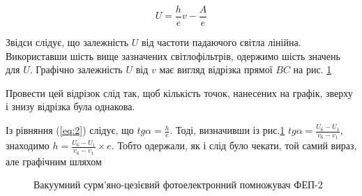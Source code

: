 \documentclass[twocolumn]{el-author}
\begin{document}
\begin{equation} \label{eq:2}
U = \frac{h}{e}v - \frac{A}{e}
\end{equation}

Звідси слідує, що залежність $U$ від частоти падаючого світла лінійна. Використавши шість вище зазначених світлофільтрів, одержимо шість значень для $U$. Графічно залежність $U$ від $v$ має вигляд відрізка прямої $BC$ на рис. \ref{img:1}

\begin{figure}[h]
\caption{\source{}}
\label{img:1}
\end{figure}

Провести цей відрізок слід так, щоб кількість точок, нанесених на
графік, зверху і знизу відрізка була однакова.

Із рівняння (\ref{eq:2}) слідує, що $tg\alpha = \frac{h}{e}$. Тоді,
визначивши із рис.\ref{img:1} $tg\alpha = \frac{U_{6} - U_{1}}{v_{6} - v_{1}}$, 
знаходимо $h = \frac{U_{6} - U_{1}}{v_{6} - v_{1}}\times e$. 
Тобто одержали, як і слід було чекати, той самий вираз, але графічним шляхом

\begin{figure}[h]
\caption{Вакуумний сурм'яно-цезієвий фотоелектронний помножувач ФЕП-2
\source{}}
\label{img:2}
\end{figure}
\end{document}
